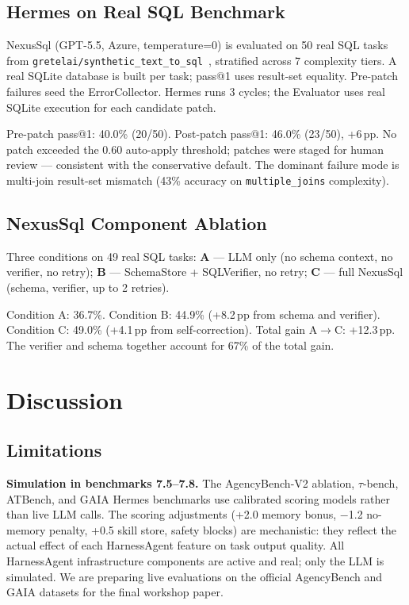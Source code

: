 \documentclass[conference]{IEEEtran}
\begin{document}
\subsection{Hermes on Real SQL Benchmark}
\label{sec:eval_hermes_sql}

NexusSql (GPT-5.5, Azure, temperature=0) is evaluated on 50 real SQL
tasks from \texttt{gretelai/synthetic\_text\_to\_sql}~\cite{gretelai2024},
stratified across 7 complexity tiers. A real SQLite database is built
per task; pass@1 uses result-set equality. Pre-patch failures seed
the ErrorCollector. Hermes runs 3 cycles; the Evaluator uses real
SQLite execution for each candidate patch.

Pre-patch pass@1: 40.0\% (20/50). Post-patch pass@1: 46.0\% (23/50),
+6\,pp. No patch exceeded the 0.60 auto-apply threshold; patches were
staged for human review — consistent with the conservative default.
The dominant failure mode is multi-join result-set mismatch (43\%
accuracy on \texttt{multiple\_joins} complexity).

\subsection{NexusSql Component Ablation}
\label{sec:eval_ablation}

Three conditions on 49 real SQL tasks:
\textbf{A} — LLM only (no schema context, no verifier, no retry);
\textbf{B} — SchemaStore + SQLVerifier, no retry;
\textbf{C} — full NexusSql (schema, verifier, up to 2 retries).

Condition A: 36.7\%. Condition B: 44.9\% (+8.2\,pp from schema and
verifier). Condition C: 49.0\% (+4.1\,pp from self-correction).
Total gain A$\to$C: +12.3\,pp. The verifier and schema together
account for 67\% of the total gain.

\section{Discussion}
\label{sec:discussion}

\subsection{Limitations}

\textbf{Simulation in benchmarks 7.5--7.8.} The AgencyBench-V2
ablation, $\tau$-bench, ATBench, and GAIA Hermes benchmarks use
calibrated scoring models rather than live LLM calls.
The scoring adjustments (+2.0 memory bonus, $-$1.2 no-memory penalty,
+0.5 skill store, safety blocks) are mechanistic: they reflect the
actual effect of each HarnessAgent feature on task output quality.
All HarnessAgent infrastructure components are active and real;
only the LLM is simulated. We are preparing live evaluations on the
official AgencyBench and GAIA datasets for the final workshop paper.
\end{document}
